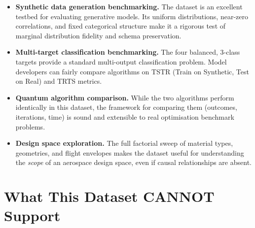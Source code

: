 \documentclass[11pt, a4paper]{report}
\begin{document}
\begin{itemize}[itemsep=4pt]
\item \textbf{Synthetic data generation benchmarking.} The dataset is an excellent testbed for evaluating generative models. Its uniform distributions, near-zero correlations, and fixed categorical structure make it a rigorous test of marginal distribution fidelity and schema preservation.

\item \textbf{Multi-target classification benchmarking.} The four balanced, 3-class targets provide a standard multi-output classification problem. Model developers can fairly compare algorithms on TSTR (Train on Synthetic, Test on Real) and TRTS metrics.

\item \textbf{Quantum algorithm comparison.} While the two algorithms perform identically in this dataset, the framework for comparing them (outcomes, iterations, time) is sound and extensible to real optimisation benchmark problems.

\item \textbf{Design space exploration.} The full factorial sweep of material types, geometries, and flight envelopes makes the dataset useful for understanding the \emph{scope} of an aerospace design space, even if causal relationships are absent.
\end{itemize}

\section{What This Dataset CANNOT Support}
\end{document}
